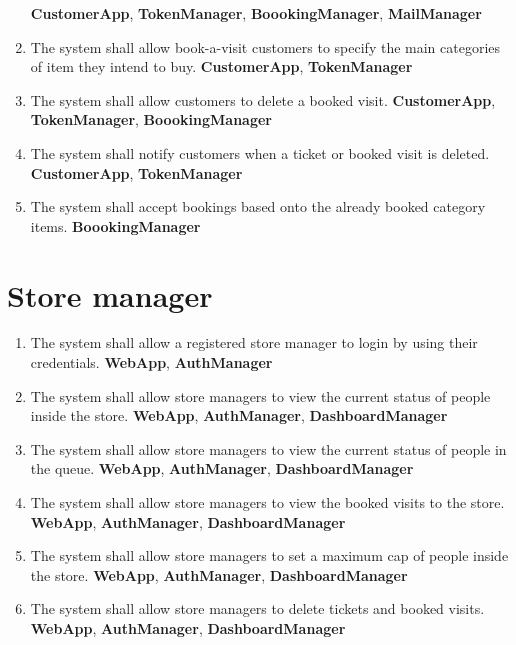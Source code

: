 \begin{enumerate}[series=requirements, label=\textbf{R.\arabic*}]
	\newline\textbf{CustomerApp}, \textbf{TokenManager}, \textbf{BoookingManager}, \textbf{MailManager}
	\item The system shall allow book-a-visit customers to specify the main categories of item they intend to buy.
	\newline\textbf{CustomerApp}, \textbf{TokenManager}
	\item The system shall allow customers to delete a booked visit.
	\newline\textbf{CustomerApp}, \textbf{TokenManager}, \textbf{BoookingManager}
	\item The system shall notify customers when a ticket or booked visit is deleted.
	\newline\textbf{CustomerApp}, \textbf{TokenManager}
	\item The system shall accept bookings based onto the already booked category items.
	\newline\textbf{BoookingManager}
\end{enumerate}

\section{Store manager}
\begin{enumerate}[resume*=requirements]
	\item The system shall allow a registered store manager to login by using their credentials.
	\newline\textbf{WebApp}, \textbf{AuthManager}
	\item The system shall allow store managers to view the current status of people inside the store.
	\newline\textbf{WebApp}, \textbf{AuthManager}, \textbf{DashboardManager}
	\item The system shall allow store managers to view the current status of people in the queue.
	\newline\textbf{WebApp}, \textbf{AuthManager}, \textbf{DashboardManager}
	\item The system shall allow store managers to view the booked visits to the store.
	\newline\textbf{WebApp}, \textbf{AuthManager}, \textbf{DashboardManager}
	\item The system shall allow store managers to set a maximum cap of people inside the store.
	\newline\textbf{WebApp}, \textbf{AuthManager}, \textbf{DashboardManager}
	\item The system shall allow store managers to delete tickets and booked visits.
	\newline\textbf{WebApp}, \textbf{AuthManager}, \textbf{DashboardManager}
\end{enumerate}

